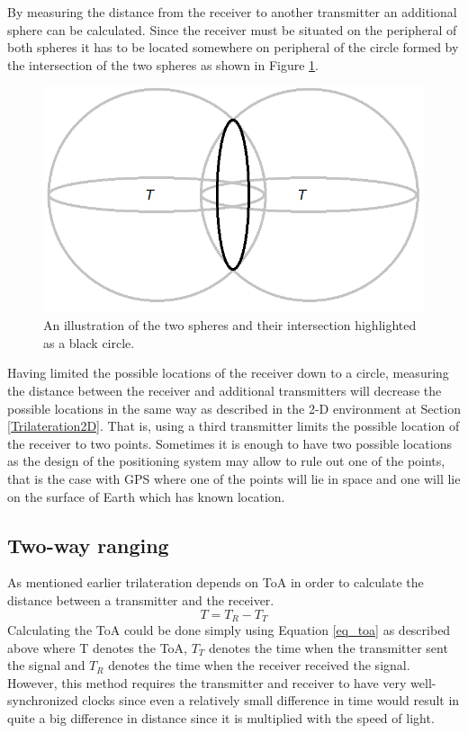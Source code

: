 By measuring the distance from the receiver to another transmitter an additional sphere can be calculated. Since the receiver must be situated on the peripheral of both spheres it has to be located somewhere on peripheral of the circle formed by the intersection of the two spheres as shown in Figure \ref{fig_2spheres}.

\begin{figure}[H] 
  \centering
      \includegraphics[height=0.25\textwidth]{img/2Spheres}
  \caption{An illustration of the two spheres and their intersection highlighted as a black circle.}
  \label{fig_2spheres}
\end{figure}

Having limited the possible locations of the receiver down to a circle, measuring the distance between the receiver and additional transmitters will decrease the possible locations in the same way as described in the 2-D environment at Section \ref{Trilateration2D}. That is, using a third transmitter limits the possible location of the receiver to two points. Sometimes it is enough to have two possible locations as the design of the positioning system may allow to rule out one of the points, that is the case with GPS where one of the points will lie in space and one will lie on the surface of Earth which has known location.


\subsection{Two-way ranging}
As mentioned earlier trilateration depends on ToA in order to calculate the distance between a transmitter and the receiver. 
\begin{equation} \label{eq_toa}
T = T_R - T_T
\end{equation}
Calculating the ToA could be done simply using 
Equation \ref{eq_toa} as described above where T denotes the ToA, $T_T$ denotes the time when the transmitter sent the signal and $T_R$ denotes the time when the receiver received the signal. However, this method requires the transmitter and receiver to have very well-synchronized clocks since even a relatively small difference in time would result in quite a big difference in distance since it is multiplied with the speed of light.

